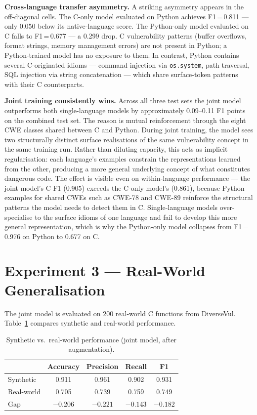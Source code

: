 \textbf{Cross-language transfer asymmetry.}
A striking asymmetry appears in the off-diagonal cells.
The C-only model evaluated on Python achieves F1\,=\,0.811 --- only 0.050 below its
native-language score.
The Python-only model evaluated on C falls to F1\,=\,0.677 --- a 0.299 drop.
C vulnerability patterns (buffer overflows, format strings, memory management errors)
are not present in Python; a Python-trained model has no exposure to them.
In contrast, Python contains several C-originated idioms --- command injection via
\texttt{os.system}, path traversal, SQL injection via string concatenation --- which share
surface-token patterns with their C counterparts.

\textbf{Joint training consistently wins.}
Across all three test sets the joint model outperforms both single-language models by
approximately 0.09--0.11 F1 points on the combined test set.
The reason is mutual reinforcement through the eight CWE classes shared between C and
Python.
During joint training, the model sees two structurally distinct surface realisations of
the same vulnerability concept in the same training run.
Rather than diluting capacity, this acts as implicit regularisation: each language's
examples constrain the representations learned from the other, producing a more general
underlying concept of what constitutes dangerous code.
The effect is visible even on within-language performance --- the joint model's C F1
(0.905) exceeds the C-only model's (0.861), because Python examples for shared CWEs such
as CWE-78 and CWE-89 reinforce the structural patterns the model needs to detect them in
C.
Single-language models over-specialise to the surface idioms of one language and fail to
develop this more general representation, which is why the Python-only model collapses
from F1\,=\,0.976 on Python to 0.677 on C.

\section{Experiment 3 --- Real-World Generalisation}

The joint model is evaluated on 200 real-world C functions from DiverseVul.
Table~\ref{tab:exp3} compares synthetic and real-world performance.

\begin{table}[H]
  \centering
  \caption{Synthetic vs.\ real-world performance (joint model, after augmentation).}
  \label{tab:exp3}
  \begin{tabular}{lcccc}
    \toprule
    & Accuracy & Precision & Recall & F1 \\
    \midrule
    Synthetic   & 0.911 & 0.961 & 0.902 & 0.931 \\
    Real-world  & 0.705 & 0.739 & 0.759 & 0.749 \\
    Gap         & $-0.206$ & $-0.221$ & $-0.143$ & $-0.182$ \\
    \bottomrule
  \end{tabular}
\end{table}

